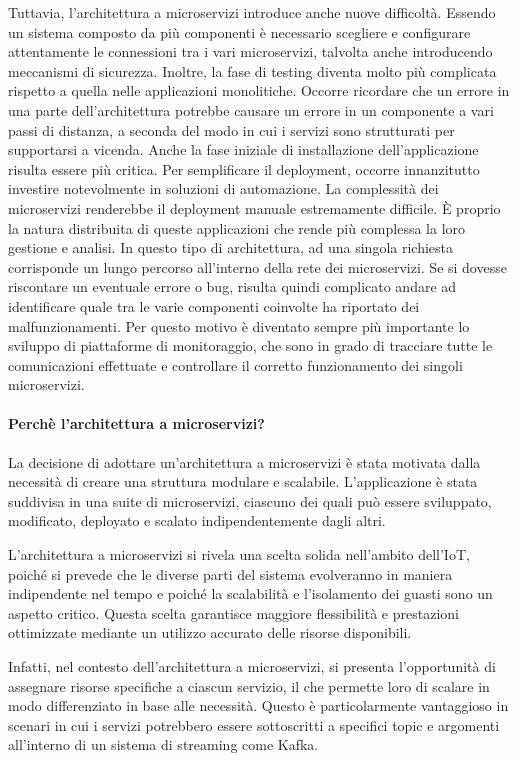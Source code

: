 Tuttavia, l’architettura a microservizi introduce anche nuove difficoltà. Essendo un sistema composto da più componenti è necessario scegliere e configurare
attentamente le connessioni tra i vari microservizi, talvolta anche introducendo
meccanismi di sicurezza. Inoltre, la fase di testing diventa molto più complicata
rispetto a quella nelle applicazioni monolitiche. Occorre ricordare che un errore in
una parte dell’architettura potrebbe causare un errore in un componente a vari
passi di distanza, a seconda del modo in cui i servizi sono strutturati per supportarsi
a vicenda.
Anche la fase iniziale di installazione dell’applicazione risulta essere più critica.
Per semplificare il deployment, occorre innanzitutto investire notevolmente in
soluzioni di automazione. La complessità dei microservizi renderebbe il deployment
manuale estremamente difficile.
È proprio la natura distribuita di queste applicazioni che rende più complessa
la loro gestione e analisi. In questo tipo di architettura, ad una singola richiesta
corrisponde un lungo percorso all’interno della rete dei microservizi. Se si dovesse
riscontare un eventuale errore o bug, risulta quindi complicato andare ad identificare
quale tra le varie componenti coinvolte ha riportato dei malfunzionamenti. Per
questo motivo è diventato sempre più importante lo sviluppo di piattaforme di
monitoraggio, che sono in grado di tracciare tutte le comunicazioni effettuate e
controllare il corretto funzionamento dei singoli microservizi.
\paragraph*{Perchè l'architettura a microservizi?}
La decisione di adottare un'architettura a microservizi è stata motivata dalla necessità di creare una struttura modulare e scalabile. L'applicazione è stata suddivisa in una suite di microservizi, ciascuno dei quali può essere sviluppato, modificato, deployato e scalato indipendentemente dagli altri.

L'architettura a microservizi si rivela una scelta solida nell'ambito dell'IoT, poiché si prevede che le diverse parti del sistema evolveranno in maniera indipendente nel tempo e poiché la scalabilità e l'isolamento dei guasti sono un aspetto critico. Questa scelta garantisce maggiore flessibilità e prestazioni ottimizzate mediante un utilizzo accurato delle risorse disponibili.

Infatti, nel contesto dell'architettura a microservizi, si presenta l'opportunità di assegnare risorse specifiche a ciascun servizio, il che permette loro di scalare in modo differenziato in base alle necessità. Questo è particolarmente vantaggioso in scenari in cui i servizi potrebbero essere sottoscritti a specifici topic e argomenti all'interno di un sistema di streaming come Kafka.

